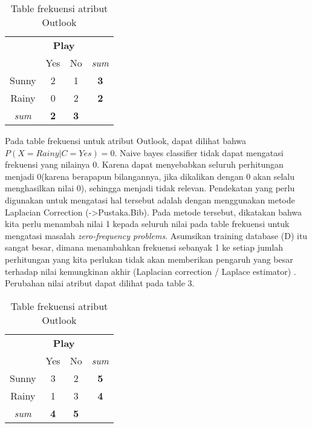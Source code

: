 		\begin{table}[ht]
			\centering
			\caption{Table frekuensi atribut Outlook}
			\begin{tabular}{ | c | c | c | c | }
			\hline
			 & \multicolumn{2}{c}{\textbf{Play}} & \\ 
			 & Yes & No & \textit{sum} \\
			\hline
			Sunny & 2 & 1 & \textbf{3}\\
			\hline
			Rainy & 0 & 2 & \textbf{2} \\
			\hline
			\textit{sum} & \textbf{2} & \textbf{3} & \\
			\hline
			\end{tabular}
		\end{table}
		
		Pada table frekuensi untuk atribut Outlook, dapat dilihat bahwa $P(X=Rainy|C=Yes) = 0$. Naive bayes classifier tidak dapat mengatasi frekuensi yang nilainya 0. Karena dapat menyebabkan seluruh perhitungan menjadi 0(karena berapapun bilangannya, jika dikalikan dengan 0 akan selalu menghasilkan nilai 0), sehingga menjadi tidak relevan. Pendekatan yang perlu digunakan untuk mengatasi hal tersebut adalah dengan menggunakan metode Laplacian Correction (->Pustaka.Bib). Pada metode tersebut, dikatakan bahwa kita perlu menambah nilai 1 kepada seluruh nilai pada table frekuensi untuk mengatasi masalah \textit{zero-frequency problems}. Asumsikan training database (D) itu sangat besar, dimana menambahkan frekuensi sebanyak 1 ke setiap jumlah perhitungan yang kita perlukan tidak akan memberikan pengaruh yang besar terhadap nilai kemungkinan akhir (Laplacian correction / Laplace estimator) \cite{PeughMissing:2004}. Perubahan nilai atribut dapat dilihat pada table 3. \\
		
		\begin{table}[ht]
			\centering
			\caption{Table frekuensi atribut Outlook}
			\begin{tabular}{|c|c|c|c|}
			\hline
			 & \multicolumn{2}{c}{\textbf{Play}} & \\
			 & Yes & No & \textit{sum} \\ 
			\hline
			Sunny & 3 & 2 & \textbf{5}\\
			\hline
			Rainy & 1 & 3 & \textbf{4} \\
			\hline
			\textit{sum} & \textbf{4} & \textbf{5} & \\
			\hline
			\end{tabular}
		\end{table}
		
